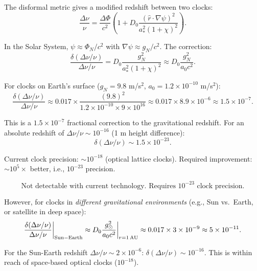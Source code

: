 \documentclass[11pt,a4paper]{article}
\begin{document}
The disformal metric gives a modified redshift between two clocks:
\begin{equation}
\frac{\Delta\nu}{\nu} = \frac{\Delta\Phi}{c^2}\left(1 + D_0\frac{(\hat{r}\cdot\nabla\psi)^2}{a_*^2(1+\chi)^2}\right).
\end{equation}

In the Solar System, $\psi \approx \Phi_N/c^2$ with $\nabla\psi \approx g_N/c^2$. The correction:
\begin{equation}
\frac{\delta(\Delta\nu/\nu)}{\Delta\nu/\nu} = D_0\frac{g_N^2}{a_*^2(1+\chi)^2} \approx D_0\frac{g_N^2}{a_0 c^2}.
\end{equation}

For clocks on Earth's surface ($g_N = 9.8$ m/s$^2$, $a_0 = 1.2 \times 10^{-10}$ m/s$^2$):
\begin{equation}
\frac{\delta(\Delta\nu/\nu)}{\Delta\nu/\nu} \approx 0.017 \times \frac{(9.8)^2}{1.2\times10^{-10} \times 9\times10^{16}} \approx 0.017 \times 8.9 \times 10^{-6} \approx 1.5 \times 10^{-7}.
\end{equation}

This is a $1.5 \times 10^{-7}$ fractional correction to the gravitational redshift. For an absolute redshift of $\Delta\nu/\nu \sim 10^{-16}$ (1 m height difference):
\begin{equation}
\delta(\Delta\nu/\nu) \sim 1.5 \times 10^{-23}.
\end{equation}

Current clock precision: $\sim 10^{-18}$ (optical lattice clocks). Required improvement: $\sim 10^5\times$ better, i.e., $10^{-23}$ precision.

\begin{equation}
\boxed{\text{Not detectable with current technology. Requires $10^{-23}$ clock precision.}}
\end{equation}

However, for clocks in \emph{different gravitational environments} (e.g., Sun vs.\ Earth, or satellite in deep space):
\begin{equation}
\frac{\delta(\Delta\nu/\nu)}{\Delta\nu/\nu}\bigg|_{\rm Sun-Earth} \approx D_0\frac{g_\odot^2}{a_0 c^2}\bigg|_{r=1\,\rm AU} \approx 0.017 \times 3 \times 10^{-9} \approx 5 \times 10^{-11}.
\end{equation}

For the Sun-Earth redshift $\Delta\nu/\nu \sim 2 \times 10^{-6}$: $\delta(\Delta\nu/\nu) \sim 10^{-16}$. This is within reach of space-based optical clocks ($10^{-18}$).
\end{document}
